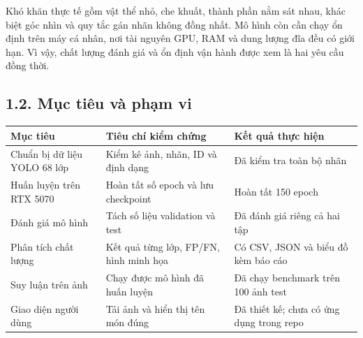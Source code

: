 \documentclass[
  vietnamese,
  12pt,
  a4paper,
]{article}
\newcounter{none} %
\begin{document}
Khó khăn thực tế gồm vật thể nhỏ, che khuất, thành phần nằm sát nhau,
khác biệt góc nhìn và quy tắc gán nhãn không đồng nhất. Mô hình còn cần
chạy ổn định trên máy cá nhân, nơi tài nguyên GPU, RAM và dung lượng đĩa
đều có giới hạn. Vì vậy, chất lượng đánh giá và ổn định vận hành được
xem là hai yêu cầu đồng thời.

\subsection{1.2. Mục tiêu và phạm
vi}\label{mux1ee5c-tiuxeau-vuxe0-phux1ea1m-vi}

\begingroup\small\setlength{\tabcolsep}{4pt}\renewcommand{\arraystretch}{1.12}

{\def\LTcaptype{none} %
\begin{longtable}[]{@{}
  >{\raggedright\arraybackslash}p{}
  >{\raggedright\arraybackslash}p{}
  >{\raggedright\arraybackslash}p{}@{}}
\toprule\noalign{}
\begin{minipage}[b]{\linewidth}\raggedright
Mục tiêu
\end{minipage} & \begin{minipage}[b]{\linewidth}\raggedright
Tiêu chí kiểm chứng
\end{minipage} & \begin{minipage}[b]{\linewidth}\raggedright
Kết quả thực hiện
\end{minipage} \\
\midrule\noalign{}
\endhead
\bottomrule\noalign{}
\endlastfoot
Chuẩn bị dữ liệu YOLO 68 lớp & Kiểm kê ảnh, nhãn, ID và định dạng & Đã
kiểm tra toàn bộ nhãn \\
Huấn luyện trên RTX 5070 & Hoàn tất số epoch và lưu checkpoint & Hoàn
tất 150 epoch \\
Đánh giá mô hình & Tách số liệu validation và test & Đã đánh giá riêng
cả hai tập \\
Phân tích chất lượng & Kết quả từng lớp, FP/FN, hình minh họa & Có CSV,
JSON và biểu đồ kèm báo cáo \\
Suy luận trên ảnh & Chạy được mô hình đã huấn luyện & Đã chạy benchmark
trên 100 ảnh test \\
Giao diện người dùng & Tải ảnh và hiển thị tên món đúng & Đã thiết kế;
chưa có ứng dụng trong repo \\
\end{longtable}
}
\end{document}
